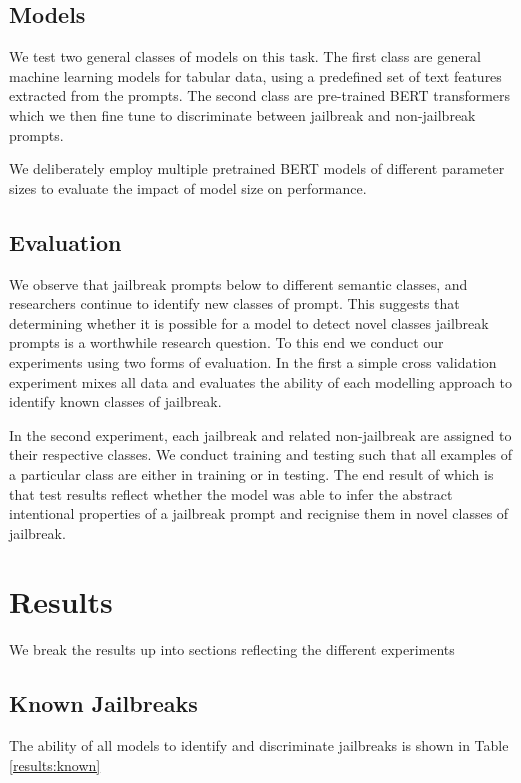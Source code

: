 \documentclass[12pt,a4paper]{article}
\begin{document}
\subsection{Models}

We test two general classes of models on this task. The first class are general machine
learning models for tabular data, using a predefined set of text features extracted
from the prompts. The second class are pre-trained BERT transformers which we then fine
tune to discriminate between jailbreak and non-jailbreak prompts.

We deliberately employ multiple pretrained BERT models of different parameter sizes to 
evaluate the impact of model size on performance.

\subsection{Evaluation}

We observe that jailbreak prompts below to different semantic classes, and 
researchers continue to identify new classes of prompt. This suggests that determining
whether it is possible for a model to detect novel classes jailbreak prompts is a 
worthwhile research question. To this end we conduct our experiments using two
forms of evaluation. In the first a simple cross validation experiment mixes all data
and evaluates the ability of each modelling approach to identify known classes
of jailbreak. 

In the second experiment, each jailbreak and related non-jailbreak are assigned to
their respective classes. We conduct training and testing such that all examples of
a particular class are either in training or in testing. The end result of which is
that test results reflect whether the model was able to infer the abstract intentional
properties of a jailbreak prompt and recignise them in novel classes of jailbreak.


\section{Results}

We break the results up into sections reflecting the different experiments

\subsection{Known Jailbreaks}

The ability of all models to identify and discriminate jailbreaks is shown in
Table \ref{results:known}
\end{document}
